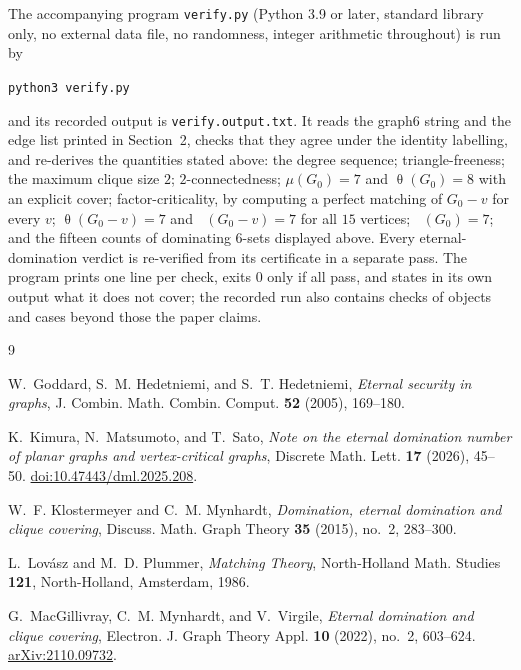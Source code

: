 \documentclass[11pt]{amsart}
\theoremstyle{remark}
\DeclareMathOperator{\edom}{\gamma^{\infty}}
\DeclareMathOperator{\thet}{\theta}
\newcommand{\Gz}{G_0}
\begin{document}
The accompanying program \texttt{verify.py} (Python 3.9 or later, standard library only, no
external data file, no randomness, integer arithmetic throughout) is run by
\begin{center}\verb+python3 verify.py+\end{center}
and its recorded output is \texttt{verify.output.txt}. It reads the graph6 string and the edge
list printed in Section~2, checks that they agree under the identity labelling, and re-derives the
quantities stated above: the degree sequence; triangle-freeness; the maximum clique size $2$;
$2$-connectedness; $\mu(\Gz)=7$ and $\thet(\Gz)=8$ with an explicit
cover; factor-criticality, by computing a perfect matching of $\Gz-v$ for every $v$;
$\thet(\Gz-v)=7$ and $\edom(\Gz-v)=7$ for all $15$ vertices; $\edom(\Gz)=7$; and the fifteen
counts of dominating $6$-sets displayed above. Every eternal-domination verdict is re-verified
from its certificate in a separate pass. The program prints one line per check, exits $0$ only if
all pass, and states in its own output what it does not cover; the recorded run also contains
checks of objects and cases beyond those the paper claims.

\begin{thebibliography}{9}

W.~Goddard, S.~M. Hedetniemi, and S.~T. Hedetniemi,
\emph{Eternal security in graphs},
J. Combin. Math. Combin. Comput. \textbf{52} (2005), 169--180.

K.~Kimura, N.~Matsumoto, and T.~Sato,
\emph{Note on the eternal domination number of planar graphs and vertex-critical graphs},
Discrete Math. Lett. \textbf{17} (2026), 45--50.
\href{https://doi.org/10.47443/dml.2025.208}{doi:10.47443/dml.2025.208}.

W.~F. Klostermeyer and C.~M. Mynhardt,
\emph{Domination, eternal domination and clique covering},
Discuss. Math. Graph Theory \textbf{35} (2015), no.~2, 283--300.

L.~Lov\'asz and M.~D. Plummer,
\emph{Matching Theory},
North-Holland Math. Studies \textbf{121}, North-Holland, Amsterdam, 1986.

G.~MacGillivray, C.~M. Mynhardt, and V.~Virgile,
\emph{Eternal domination and clique covering},
Electron. J. Graph Theory Appl. \textbf{10} (2022), no.~2, 603--624.
\href{https://arxiv.org/abs/2110.09732}{arXiv:2110.09732}.

\end{thebibliography}
\end{document}
